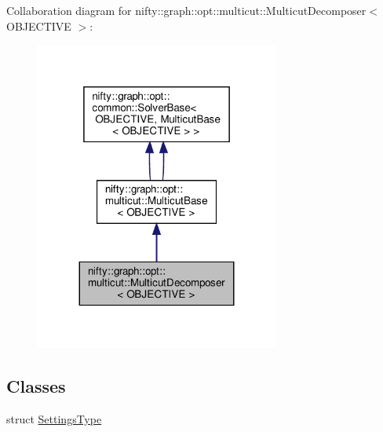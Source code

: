 Collaboration diagram for nifty\+:\+:graph\+:\+:opt\+:\+:multicut\+:\+:Multicut\+Decomposer$<$ O\+B\+J\+E\+C\+T\+I\+VE $>$\+:
\nopagebreak
\begin{figure}[H]
\begin{center}
\leavevmode
\includegraphics[width=227pt]{classnifty_1_1graph_1_1opt_1_1multicut_1_1MulticutDecomposer__coll__graph}
\end{center}
\end{figure}
\subsection*{Classes}
\begin{DoxyCompactItemize}
\item 
struct \hyperlink{structnifty_1_1graph_1_1opt_1_1multicut_1_1MulticutDecomposer_1_1SettingsType}{Settings\+Type}
\end{DoxyCompactItemize}
